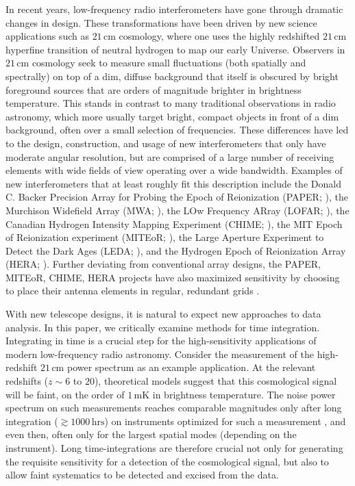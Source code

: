 \documentclass[twocolumn,apj,numberedappendix]{emulateapj}
\begin{document}
In recent years, low-frequency radio interferometers have gone through dramatic changes in design.
These transformations have been driven by new science applications such as $21\,\textrm{cm}$
cosmology, where one uses the highly redshifted $21\,\textrm{cm}$ hyperfine transition
of neutral hydrogen to map our early Universe. Observers in $21\,\textrm{cm}$ cosmology seek to
measure small fluctuations (both spatially and spectrally) on top of a dim, diffuse background that itself is obscured by bright
foreground sources that are orders of magnitude brighter in brightness temperature. This stands
in contrast to many traditional observations in radio astronomy, which more usually target bright,
compact objects in front of a dim background, often over a small selection of frequencies. These differences have led to the design, construction, 
and usage of new interferometers that only have moderate angular resolution, but are comprised of a
large number of receiving elements with wide fields of view operating over a wide bandwidth. Examples of new interferometers that at least roughly fit this description include the Donald C. Backer Precision Array for Probing the Epoch of Reionization (PAPER; \citealt{parsons_et_al2010}), the Murchison Widefield Array (MWA; \citealt{tingay_et_al2013,bowman_et_al2012}), the LOw Frequency ARray (LOFAR; \citealt{van_haarlem_et_al2013}), the Canadian Hydrogen Intensity Mapping Experiment (CHIME; \citealt{bandura_et_al2014}), the MIT Epoch of Reionization experiment (MITEoR; \citealt{zheng_et_al2014}), the Large Aperture Experiment to Detect the 
Dark Ages (LEDA; \citealt{greenhill_et_al2012}), and the Hydrogen Epoch of Reionization
Array (HERA; \citealt{pober_et_al2014}). Further deviating from conventional array
designs, the PAPER, MITEoR, CHIME, HERA projects have also maximized sensitivity by choosing to place their antenna elements in regular, redundant grids \citep{parsons_et_al2012a}.

With new telescope designs, it is natural to expect new approaches to data analysis. In this paper,
we critically examine methods for time integration. Integrating in time is a crucial step for the
high-sensitivity applications of modern low-frequency radio astronomy. Consider the measurement of
the high-redshift $21\,\textrm{cm}$ power spectrum as an example application. At the relevant redshifts ($z\sim 6$ to $20$), theoretical models suggest that this cosmological signal will be faint, on the order of $1\,\textrm{mK}$ in brightness temperature. The noise power spectrum on such
measurements reaches comparable magnitudes only after long integration ($\gtrsim 1000\,\textrm{hrs}$)
on instruments optimized for such a measurement \citep{harker_et_al2010,parsons_et_al2012a,beardsley_et_al2013,pober_et_al2014}, and even then, often only for the largest spatial modes (depending on the instrument).
Long time-integrations are therefore crucial not only for generating the requisite sensitivity for a
detection of the cosmological signal, but also to allow faint systematics to be detected and excised
from the data.
\end{document}
